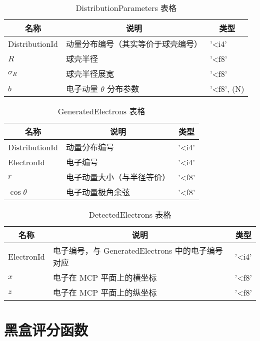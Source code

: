 \documentclass{article}
\begin{document}
\begin{table}[H]
    \caption{DistributionParameters 表格}
        \label{tab:DistributionParameters}
        \centering
        {
            \begin{tabular}[c]{l|l|l}
                \hline
                \multicolumn{1}{c|}{\textbf{名称}} & 
                \multicolumn{1}{c|}{\textbf{说明}} & 
                \multicolumn{1}{c}{\textbf{类型}} \\
                \hline
                DistributionId & 动量分布编号（其实等价于球壳编号） & '<i4' \\
                $R$ & 球壳半径 & '<f8' \\
                $\sigma_R$ & 球壳半径展宽 & '<f8' \\
                $b$ & 电子动量 $\theta$ 分布参数 & '<f8', (N)\\
                \hline
            \end{tabular}
        }
\end{table}

\begin{table}[H]
    \caption{GeneratedElectrons 表格}
        \label{tab:GeneratedElectrons2}
        \centering
        {
            \begin{tabular}[c]{l|l|l}
                \hline
                \multicolumn{1}{c|}{\textbf{名称}} & 
                \multicolumn{1}{c|}{\textbf{说明}} & 
                \multicolumn{1}{c}{\textbf{类型}} \\
                \hline
                DistributionId & 动量分布编号 & '<i4' \\
                ElectronId & 电子编号 & '<i4' \\
                $r$ & 电子动量大小（与半径等价） & '<f8' \\
                $\cos\theta$ & 电子动量极角余弦 & '<f8' \\
                \hline
            \end{tabular}
        }
\end{table}

\begin{table}[H]
    \caption{DetectedElectrons 表格}
        \label{tab:DetectedElectrons2}
        \centering
        {
            \begin{tabular}[c]{l|l|l}
                \hline
                \multicolumn{1}{c|}{\textbf{名称}} & 
                \multicolumn{1}{c|}{\textbf{说明}} & 
                \multicolumn{1}{c}{\textbf{类型}} \\
                \hline
                ElectronId & 电子编号，与 GeneratedElectrons 中的电子编号对应 & '<i4' \\
                $x$ & 电子在 MCP 平面上的横坐标 & '<f8' \\
                $z$ & 电子在 MCP 平面上的纵坐标 & '<f8' \\
                \hline
            \end{tabular}
        }
\end{table}




\section{黑盒评分函数} %
\label{sec:黑盒评分函数}
    
\end{document}
